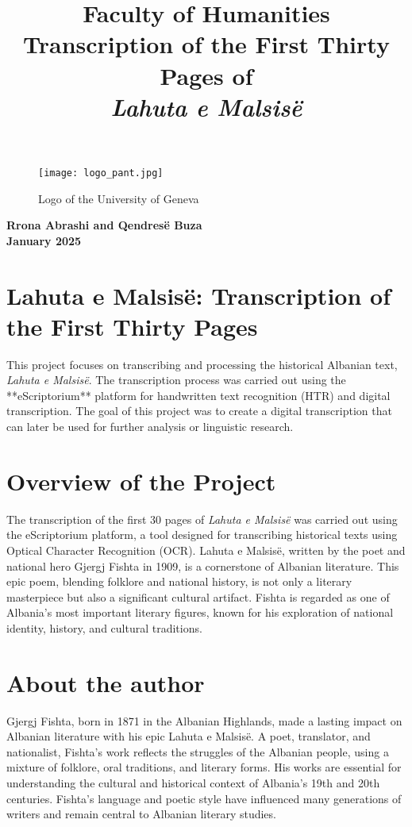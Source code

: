 \documentclass[12pt]{article}
\title{
  \vspace{-2cm} 
  \fontsize{30}{36}\selectfont\textbf{Faculty of Humanities} \\ 
  \fontsize{24}{28}\selectfont Transcription of the First Thirty Pages of \\ 
  \textit{Lahuta e Malsisë} 
}
\date{}
\begin{document}
\maketitle
\begin{figure}[ht]
    \centering
    \texttt{[image: logo\_pant.jpg]}
    \caption{Logo of the University of Geneva}
    \label{fig:logo}
    \vspace{2cm}
\end{figure}

\vspace{\fill}
\begin{center}
    \textbf{Rrona Abrashi and Qendresë Buza} \\[0.5cm]
    \textbf{January 2025} \\[1cm]
\end{center}


\newpage

\section*{Lahuta e Malsisë: Transcription of the First Thirty Pages}
This project focuses on transcribing and processing the historical Albanian text, \textit{Lahuta e Malsisë}. The transcription process was carried out using the **eScriptorium** platform for handwritten text recognition (HTR) and digital transcription. The goal of this project was to create a digital transcription that can later be used for further analysis or linguistic research.


\section*{Overview of the Project}
The transcription of the first 30 pages of \textit{Lahuta e Malsisë} was carried out using the eScriptorium platform, a tool designed for transcribing historical texts using Optical Character Recognition (OCR). Lahuta e Malsisë, written by the poet and national hero Gjergj Fishta in 1909, is a cornerstone of Albanian literature. This epic poem, blending folklore and national history, is not only a literary masterpiece but also a significant cultural artifact. Fishta is regarded as one of Albania's most important literary figures, known for his exploration of national identity, history, and cultural traditions.

\section*{About the author}
Gjergj Fishta, born in 1871 in the Albanian Highlands, made a lasting impact on Albanian literature with his epic Lahuta e Malsisë. A poet, translator, and nationalist, Fishta's work reflects the struggles of the Albanian people, using a mixture of folklore, oral traditions, and literary forms. His works are essential for understanding the cultural and historical context of Albania’s 19th and 20th centuries. Fishta's language and poetic style have influenced many generations of writers and remain central to Albanian literary studies.
\end{document}
